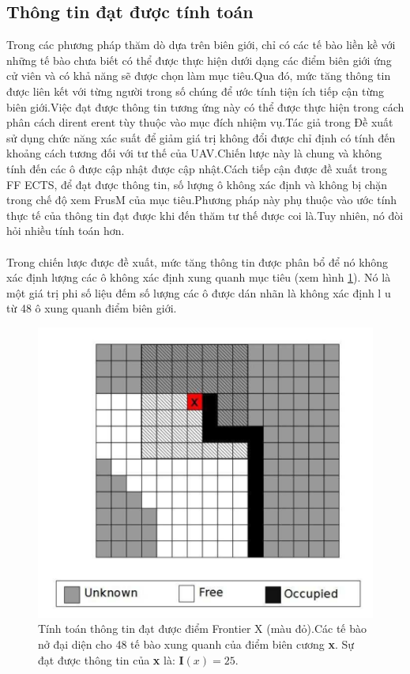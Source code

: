 \documentclass[11pt,openany]{book}
\begin{document}
\subsection{Thông tin đạt được tính toán}
Trong các phương pháp thăm dò dựa trên biên giới, chỉ có các tế bào liền kề với những tế bào chưa biết có thể được thực hiện dưới dạng các điểm biên giới ứng cử viên và có khả năng sẽ được chọn làm mục tiêu.Qua đó, mức tăng thông tin được liên kết với từng người trong số chúng để ước tính tiện ích tiếp cận từng biên giới.Việc đạt được thông tin tương ứng này có thể được thực hiện trong cách phân cách dirent erent tùy thuộc vào mục đích nhiệm vụ.Tác giả trong \cite{burgard2005coordinated} Đề xuất sử dụng chức năng xác suất để giảm giá trị không đổi được chỉ định có tính đến khoảng cách tương đối với tư thế của UAV.Chiến lược này là chung và không tính đến các ô được cập nhật được cập nhật.Cách tiếp cận được đề xuất trong \cite{heng2015efficient} FF ECTS, để đạt được thông tin, số lượng ô không xác định và không bị chặn trong chế độ xem FrusM của mục tiêu.Phương pháp này phụ thuộc vào ước tính thực tế của thông tin đạt được khi đến thăm tư thế được coi là.Tuy nhiên, nó đòi hỏi nhiều tính toán hơn.\\\\
Trong chiến lược được đề xuất, mức tăng thông tin được phân bổ để nó không xác định lượng các ô không xác định xung quanh mục tiêu (xem hình \ref{fig:3.4}). Nó là một giá trị phi số liệu đếm số lượng các ô được dán nhãn là không xác định l u từ 48 ô xung quanh điểm biên giới.
\begin{figure}[H]
    \centering
    \includegraphics[tỉ lệ=0.4]{assets/3_4.png}
    \caption{Tính toán thông tin đạt được điểm Frontier X (màu đỏ).Các tế bào nở đại diện cho 48 tế bào xung quanh của điểm biên cương \textbf{x}. Sự đạt được thông tin của \textbf{x} là: $\mathbf{I}(x)=25$.}
    \label{fig:3.4}
\end{figure}
\end{document}
